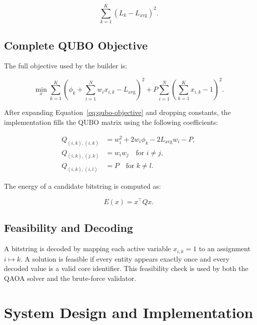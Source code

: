 \documentclass[12pt,a4paper,oneside]{report}
\begin{document}
\begin{equation}
  \sum_{k=1}^{K} \left(L_k - L_{\text{avg}}\right)^2 .
\end{equation}

\section{Complete QUBO Objective}

The full objective used by the builder is:

\begin{equation}
  \min_x
  \sum_{k=1}^{K}
  \left(
    \phi_k + \sum_{i=1}^{N} w_i x_{i,k} - L_{\text{avg}}
  \right)^2
  +
  P \sum_{i=1}^{N}
  \left(\sum_{k=1}^{K} x_{i,k} - 1\right)^2 .
  \label{eq:qubo-objective}
\end{equation}

After expanding Equation~\ref{eq:qubo-objective} and dropping constants, the
implementation fills the QUBO matrix using the following coefficients:

\begin{align}
  Q_{(i,k),(i,k)}
  &= w_i^2 + 2w_i\phi_k - 2L_{\text{avg}}w_i - P, \\
  Q_{(i,k),(j,k)}
  &= w_i w_j
  \quad \text{for } i \neq j, \\
  Q_{(i,k),(i,l)}
  &= P
  \quad \text{for } k \neq l.
\end{align}

The energy of a candidate bitstring is computed as:

\begin{equation}
  E(x) = x^\top Q x .
\end{equation}

\section{Feasibility and Decoding}

A bitstring is decoded by mapping each active variable \(x_{i,k}=1\) to an
assignment \(i \mapsto k\). A solution is feasible if every entity appears
exactly once and every decoded value is a valid core identifier. This
feasibility check is used by both the QAOA solver and the brute-force validator.

\chapter{System Design and Implementation}
\label{chap:implementation}
\end{document}
